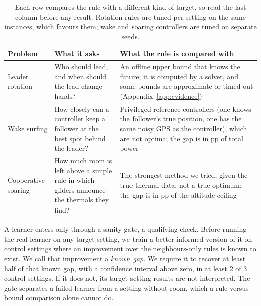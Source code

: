\documentclass[11pt]{article}
\begin{document}
\begin{table}[t]
\centering
\small
\caption{Each row compares the rule with a different kind of target, so read the last column before any result. Rotation rules are tuned per setting on the same instances, which favours them; wake and soaring controllers are tuned on separate seeds.}
\label{tab:targets}
\setlength{\tabcolsep}{4pt}
\begin{tabular}{@{}>{\raggedright\arraybackslash}p{2.6cm}>{\raggedright\arraybackslash}p{5.2cm}>{\raggedright\arraybackslash}p{7.4cm}@{}}
\toprule
Problem & What it asks & What the rule is compared with \\
\midrule
Leader rotation & Who should lead, and when should the lead change hands? & An offline upper bound that knows the future; it is computed by a solver, and some bounds are approximate or timed out (Appendix~\ref{app:evidence}) \\
Wake surfing & How closely can a controller keep a follower at the best spot behind the leader? & Privileged reference controllers (one knows the follower's true position, one has the same noisy GPS as the controller), which are not optima; the gap is in pp of total power \\
Cooperative soaring & How much room is left above a simple rule in which gliders announce the thermals they find? & The strongest method we tried, given the true thermal data; not a true optimum; the gap is in pp of the altitude ceiling \\
\bottomrule
\end{tabular}
\end{table}

A learner enters only through a sanity gate, a qualifying check.
Before running the real learner on any target setting, we train a better-informed version of it on control settings where an improvement over the neighbours-only rules is known to exist.
We call that improvement a \emph{known gap}.
We require it to recover at least half of that known gap, with a confidence interval above zero, in at least 2 of 3 control settings.
If it does not, its target-setting results are not interpreted.
The gate separates a failed learner from a setting without room, which a rule-versus-bound comparison alone cannot do.
\end{document}
